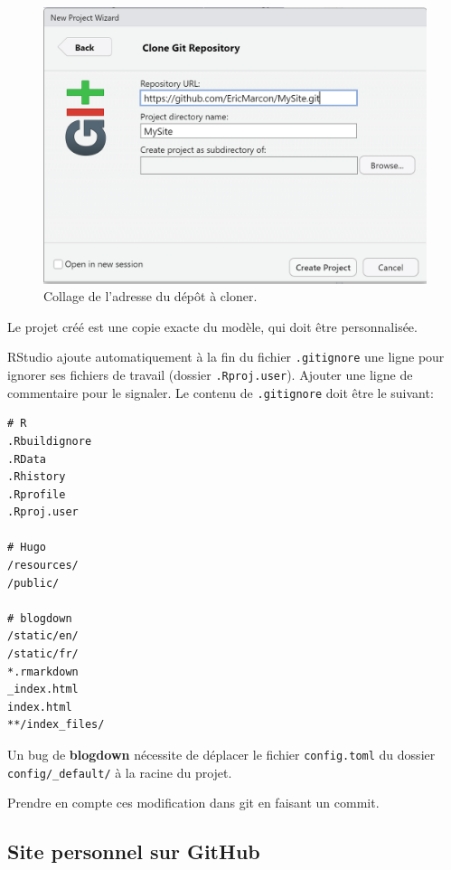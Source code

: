 \documentclass[
  12pt,
  french,
  a4paper,
  extrafontsizes,onecolumn,openright
  ]{memoir}
\begin{document}
\scriptsize

\begin{figure}

{\centering \includegraphics[width=0.8\linewidth]{images/rediger-Projet-GitHub} 

}

\caption{Collage de l'adresse du dépôt à cloner.}\label{fig:rediger-Projet-GitHub}
\end{figure}

\normalsize

Le projet créé est une copie exacte du modèle, qui doit être personnalisée.

RStudio ajoute automatiquement à la fin du fichier \texttt{.gitignore} une ligne pour ignorer ses fichiers de travail (dossier \texttt{.Rproj.user}).
Ajouter une ligne de commentaire pour le signaler.
Le contenu de \texttt{.gitignore} doit être le suivant:

\begin{verbatim}
# R
.Rbuildignore
.RData
.Rhistory
.Rprofile
.Rproj.user

# Hugo
/resources/
/public/

# blogdown
/static/en/
/static/fr/
*.rmarkdown
_index.html
index.html
**/index_files/
\end{verbatim}

Un bug de \textbf{blogdown} nécessite de déplacer le fichier \texttt{config.toml} du dossier \texttt{config/\_default/} à la racine du projet.

Prendre en compte ces modification dans git en faisant un commit.

\hypertarget{site-personnel-sur-github}{%
\subsection{Site personnel sur GitHub}\label{site-personnel-sur-github}}
\end{document}
